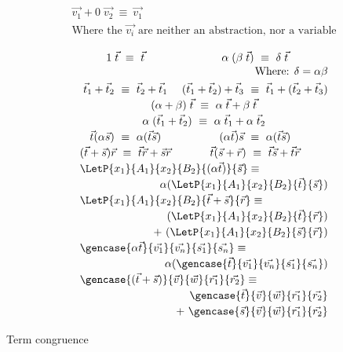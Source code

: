 \begin{table*}[tb]
  \small
  \vspace*{0.2cm}
  \[
    \begin{array}{l}
      \vec{v_1} + 0\; \vec{v_2}~\equiv~\vec{v_1}\\  
      \text{Where the $\vec{v_i}$ are neither an abstraction, nor a variable}
    \end{array}   
  \]
  
  \[\renewcommand*{\arraystretch}{1.2}
    \begin{array}{c c}
      1\;\vec{t}~\equiv~\vec{t}&
      \alpha\;(\beta\;\vec{t})~\equiv~\delta\;\vec{t}\\[-2pt]
      \multicolumn{2}{r}{\text{Where: } \delta = \alpha\beta}\\[2pt]
      \vec{t}_1+\vec{t}_2 ~\equiv~\vec{t}_2+\vec{t}_1 &
      (\vec{t}_1+\vec{t}_2)+\vec{t}_3~\equiv~\vec{t}_1+(\vec{t}_2+\vec{t}_3)\\
      \multicolumn{2}{c}{(\alpha+\beta)\;\vec{t}~\equiv~\alpha\;\vec{t}+\beta\;\vec{t}}\\
      \multicolumn{2}{c}{\alpha\;(\vec{t}_1+\vec{t}_2)~\equiv~\alpha\;\vec{t}_1+\alpha\;\vec{t}_2}\\
      \vec t (\alpha \vec s)~\equiv~ \alpha (\vec{t}\vec{s})&
      (\alpha \vec t) \vec s ~\equiv~ \alpha (\vec{t}\vec{s})\\
      (\vec t + \vec s) \vec{r}~\equiv~\vec{t}\vec{r} + \vec{s}\vec{r} &
      \vec t(\vec{s}+\vec{r})~\equiv~\vec{t}\vec{s} + \vec{t}\vec{r}\\
      \multicolumn{2}{l}{\LetP{x_1}{A_1}{x_2}{B_2}{(\alpha\vec{t})}{\vec{s}}\equiv}\\
      \multicolumn{2}{r}{\alpha(\LetP{x_1}{A_1}{x_2}{B_2}{\vec{t}}{\vec{s}})}\\
      \multicolumn{2}{l}{\LetP{x_1}{A_1}{x_2}{B_2}{\vec{t}+\vec{s}}{\vec{r}}\equiv}\\
      \multicolumn{2}{r}{(\LetP{x_1}{A_1}{x_2}{B_2}{\vec{t}}{\vec{r}})}\\
      \multicolumn{2}{r}{+~(\LetP{x_1}{A_1}{x_2}{B_2}{\vec{s}}{\vec{r}})}\\
      \multicolumn{2}{l}{\gencase{\alpha \vec{t}}{\vec{v_1}}{\vec{v_n}}{\vec{s_1}}{\vec{s_n}}\equiv}\\
      \multicolumn{2}{r}{\alpha(\gencase{\vec{t}}{\vec{v_1}}{\vec{v_n}}{\vec{s_1}}{\vec{s_n}})}\\
      \multicolumn{2}{l}{\gencase{(\vec{t}+\vec{s})}{\vec{v}}{\vec{w}}{\vec{r_1}}{\vec{r_2}}\equiv}\\
      \multicolumn{2}{r}{\gencase{\vec{t}}{\vec{v}}{\vec{w}}{\vec{r_1}}{\vec{r_2}}}\\
      \multicolumn{2}{r}{+~\gencase{\vec{s}}{\vec{v}}{\vec{w}}{\vec{r_1}}{\vec{r_2}}}
    \end{array}
  \]
  \caption{Term congruence}
  \label{tab:Congruence}
\end{table*}


